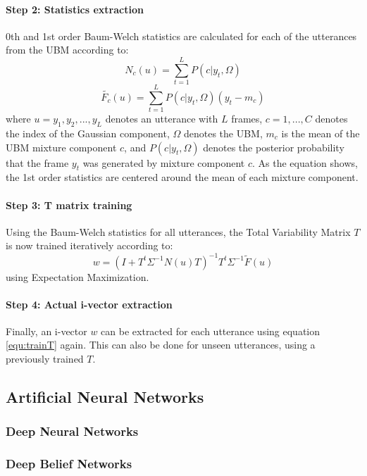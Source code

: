 \paragraph*{Step 2: Statistics extraction} 0th and 1st order Baum-Welch statistics are calculated for each of the utterances from the UBM according to:
\begin{equation}
N_c(u)=\sum_{t=1}^{L} P(c|y_t,\Omega)
\end{equation}
\begin{equation}
\widetilde{F_c}(u)=\sum_{t=1}^{L} P(c|y_t,\Omega)(y_t-m_c)
\end{equation}
where $u={y_1,y_2,...,y_L}$ denotes an utterance with $L$ frames, $c=1,...,C$ denotes the index of the Gaussian component, $\Omega$ denotes the UBM,  $m_c$ is the mean of the UBM mixture component $c$, and $P(c|y_t,\Omega)$ denotes the posterior probability that the frame $y_t$ was generated by mixture component $c$. As the equation shows, the 1st order statistics are centered around the mean of each mixture component.\\
\paragraph*{Step 3: T matrix training}
Using the Baum-Welch statistics for all utterances, the Total Variability Matrix $T$ is now trained iteratively according to:
\begin{equation}\label{equ:trainT}
w = (I+T^t \Sigma^{-1} N (u) T)^{-1}T^t \Sigma^{-1} \widetilde{F}(u)
\end{equation}
using Expectation Maximization.
\paragraph*{Step 4: Actual i-vector extraction}
Finally, an i-vector $w$ can be extracted for each utterance using equation \ref{equ:trainT} again. This can also be done for unseen utterances, using a previously trained $T$.


\subsection{Artificial Neural Networks}
\subsubsection{Deep Neural Networks}
\subsubsection{Deep Belief Networks}
